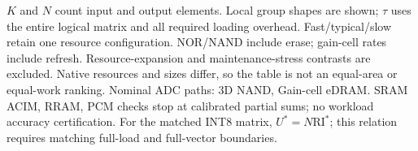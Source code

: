 \begin{table}[t]
\par\smallskip\begin{minipage}{\textwidth}\footnotesize
$K$ and $N$ count input and output elements. Local group shapes are shown; $\tau$ uses the entire logical matrix and all required loading overhead. Fast/typical/slow retain one resource configuration. NOR/NAND include erase; gain-cell rates include refresh. Resource-expansion and maintenance-stress contrasts are excluded. Native resources and sizes differ, so the table is not an equal-area or equal-work ranking. Nominal ADC paths: 3D NAND, Gain-cell eDRAM. SRAM ACIM, RRAM, PCM checks stop at calibrated partial sums; no workload accuracy certification. For the matched INT8 matrix, $U^{*}=N\mathrm{RI}^{*}$; this relation requires matching full-load and full-vector boundaries.
\end{minipage}
\end{table}
